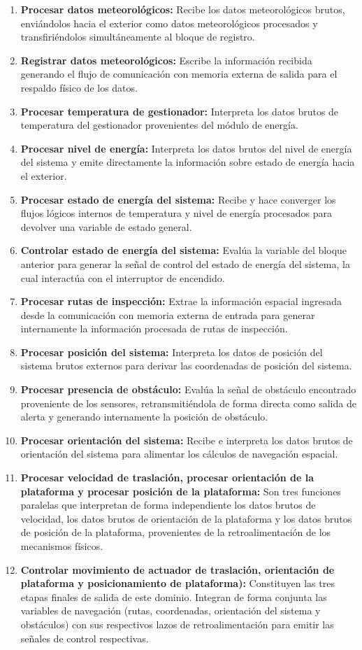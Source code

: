 \documentclass[../../General.tex]{subfiles}
\begin{document}
\begin{enumerate}
	\item \textbf{Procesar datos meteorológicos:} Recibe los datos meteorológicos brutos, enviándolos hacia el exterior como datos meteorológicos procesados y transfiriéndolos simultáneamente al bloque de registro.
	\item \textbf{Registrar datos meteorológicos:} Escribe la información recibida generando el flujo de comunicación con memoria externa de salida para el respaldo físico de los datos.
	\item \textbf{Procesar temperatura de gestionador:} Interpreta los datos brutos de temperatura del gestionador provenientes del módulo de energía.
	\item \textbf{Procesar nivel de energía:} Interpreta los datos brutos del nivel de energía del sistema y emite directamente la información sobre estado de energía hacia el exterior.
	\item \textbf{Procesar estado de energía del sistema:} Recibe y hace converger los flujos lógicos internos de temperatura y nivel de energía procesados para devolver una variable de estado general.
	\item \textbf{Controlar estado de energía del sistema:} Evalúa la variable del bloque anterior para generar la señal de control del estado de energía del sistema, la cual interactúa con el interruptor de encendido.
	\item \textbf{Procesar rutas de inspección:} Extrae la información espacial ingresada desde la comunicación con memoria externa de entrada para generar internamente la información procesada de rutas de inspección.
	\item \textbf{Procesar posición del sistema:} Interpreta los datos de posición del sistema brutos externos para derivar las coordenadas de posición del sistema.
	\item \textbf{Procesar presencia de obstáculo:} Evalúa la señal de obstáculo encontrado proveniente de los sensores, retransmitiéndola de forma directa como salida de alerta y generando internamente la posición de obstáculo.
	\item \textbf{Procesar orientación del sistema:} Recibe e interpreta los datos brutos de orientación del sistema para alimentar los cálculos de navegación espacial.
	\item \textbf{Procesar velocidad de traslación, procesar orientación de la plataforma y procesar posición de la plataforma:} Son tres funciones paralelas que interpretan de forma independiente los datos brutos de velocidad, los datos brutos de orientación de la plataforma y los datos brutos de posición de la plataforma, provenientes de la retroalimentación de los mecanismos físicos.
	\item \textbf{Controlar movimiento de actuador de traslación, orientación de plataforma y posicionamiento de plataforma):} Constituyen las tres etapas finales de salida de este dominio. Integran de forma conjunta las variables de navegación (rutas, coordenadas, orientación del sistema y obstáculos) con sus respectivos lazos de retroalimentación para emitir las señales de control respectivas.
\end{enumerate}
\end{document}
